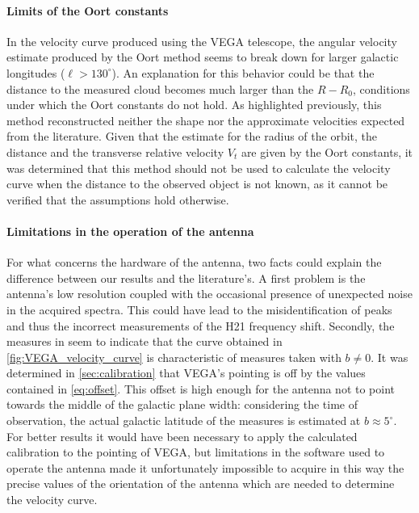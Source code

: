 \paragraph{Limits of the Oort constants}
In the velocity curve produced using the VEGA telescope, the angular velocity estimate produced by the Oort method seems to break down for larger galactic longitudes ($\ell > 130^\circ$). An explanation for this behavior could be that the distance to the measured cloud becomes much larger than the $R-R_0$, conditions under which the Oort constants do not hold.
As highlighted previously, this method reconstructed neither the shape nor the approximate velocities expected from the literature.
Given that the estimate for the radius of the orbit, the distance and the transverse relative velocity $V_t$ are given by the Oort constants, it was determined that this method should not be used to calculate the velocity curve when the distance to the observed object is not known, as it cannot be verified that the assumptions hold otherwise.

\paragraph{Limitations in the operation of the antenna}
For what concerns the hardware of the antenna, two facts could explain the difference between our results and the literature's. 
A first problem is the antenna's low resolution coupled with the occasional presence of unexpected noise in the acquired spectra. This could have lead to the misidentification of peaks and thus the incorrect measurements of the H21 frequency shift. 
Secondly, the measures in \cite{sakhawat_hossain_salsa_2018} seem to indicate that the curve obtained in \autoref{fig:VEGA_velocity_curve} is characteristic of measures taken with $b \neq 0$. 
It was determined in \autoref{sec:calibration} that VEGA's pointing is off by the values contained in \autoref{eq:offset}.
This offset is high enough for the antenna not to point towards the middle of the galactic plane width: considering the time of observation, the actual galactic latitude of the measures is estimated at $b \approx 5^{\circ}$.
For better results it would have been necessary to apply the calculated calibration to the pointing of VEGA, but limitations in the software used to operate the antenna made it unfortunately impossible to acquire in this way the precise values of the orientation of the antenna which are needed to determine the velocity curve.


